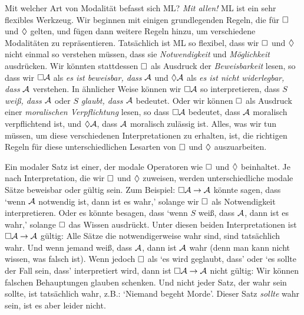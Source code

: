 Mit welcher Art von Modalität befasst sich ML? \emph{Mit allen!} ML ist ein sehr flexibles Werkzeug. Wir beginnen mit einigen grundlegenden Regeln, die für $\Box$ und $\Diamond$ gelten, und fügen dann weitere Regeln hinzu, um verschiedene Modalitäten zu repräsentieren. Tatsächlich ist ML so flexibel, dass wir $\Box$ und $\Diamond$ nicht einmal so verstehen müssen, dass sie \emph{Notwendigkeit} und \emph{Möglichkeit} ausdrücken. Wir könnten stattdessen $\Box$ als Ausdruck der \emph{Beweisbarkeit} lesen, so dass wir $\Box\mathcal{A}$ als \emph{es ist beweisbar, dass} $\mathcal{A}$ und $\Diamond\mathcal{A}$ als \emph{es ist nicht widerlegbar, dass} $\mathcal{A}$ verstehen. In ähnlicher Weise können wir $\Box\mathcal{A}$ so interpretieren, dass $S$ \emph{weiß, dass $\mathcal{A}$} oder $S$ \emph{glaubt, dass $\mathcal{A}$} bedeutet. Oder wir können $\Box$ als Ausdruck einer \emph{moralischen Verpflichtung} lesen, so dass $\Box \mathcal{A}$ bedeutet, dass $\mathcal{A}$ moralisch verpflichtend ist, und $\Diamond \mathcal{A}$, dass $\mathcal{A}$ moralisch zulässig ist. Alles, was wir tun müssen, um diese verschiedenen Interpretationen zu erhalten, ist, die richtigen Regeln für diese unterschiedlichen Lesarten von $\Box$ und $\Diamond$ auszuarbeiten.

Ein modaler Satz ist einer, der modale Operatoren wie $\Box$ und $\Diamond$ beinhaltet. Je nach Interpretation, die wir $\Box$ und $\Diamond$ zuweisen, werden unterschiedliche modale Sätze beweisbar oder gültig sein. Zum Beispiel: $\Box \mathcal{A} \rightarrow \mathcal{A}$ könnte sagen, dass `wenn $\mathcal{A}$ notwendig ist, dann ist es wahr,' solange wir $\Box$ als Notwendigkeit interpretieren. Oder es könnte besagen, dass `wenn $S$ weiß, dass $\mathcal{A}$, dann ist es wahr,' solange $\Box$ das Wissen ausdrückt. Unter diesen beiden Interpretationen ist $\Box\mathcal{A} \rightarrow \mathcal{A}$ gültig: Alle Sätze die notwendigerweise wahr sind, sind tatsächlich wahr. Und wenn jemand weiß, dass $\mathcal{A}$, dann ist $\mathcal{A}$ wahr (denn man kann nicht wissen, was falsch ist). Wenn jedoch $\Box$ als `es wird geglaubt, dass' oder `es sollte der Fall sein, dass' interpretiert wird, dann ist $\Box\mathcal{A} \rightarrow \mathcal{A}$ nicht gültig: Wir können falschen Behauptungen glauben schenken. Und nicht jeder Satz, der wahr sein sollte, ist tatsächlich wahr, z.B.\@: `Niemand begeht Morde'. Dieser Satz \emph{sollte} wahr sein, ist es aber leider nicht. 

